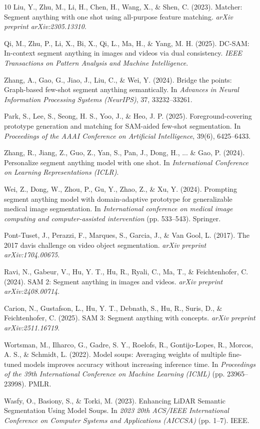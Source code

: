 \documentclass[journal,12pt,onecolumn,draftclsnofoot]{IEEEtran}
\begin{document}
\begin{thebibliography}{10}
Liu, Y., Zhu, M., Li, H., Chen, H., Wang, X., \& Shen, C. (2023).
Matcher: Segment anything with one shot using all-purpose feature matching.
\textit{arXiv preprint arXiv:2305.13310}.

Qi, M., Zhu, P., Li, X., Bi, X., Qi, L., Ma, H., \& Yang, M. H. (2025).
DC-SAM: In-context segment anything in images and videos via dual consistency.
\textit{IEEE Transactions on Pattern Analysis and Machine Intelligence}.

Zhang, A., Gao, G., Jiao, J., Liu, C., \& Wei, Y. (2024).
Bridge the points: Graph-based few-shot segment anything semantically.
In \textit{Advances in Neural Information Processing Systems (NeurIPS)}, 37, 33232--33261.

Park, S., Lee, S., Seong, H. S., Yoo, J., \& Heo, J. P. (2025).
Foreground-covering prototype generation and matching for SAM-aided few-shot segmentation.
In \textit{Proceedings of the AAAI Conference on Artificial Intelligence}, 39(6), 6425--6433.

Zhang, R., Jiang, Z., Guo, Z., Yan, S., Pan, J., Dong, H., ... \& Gao, P. (2024). 
Personalize segment anything model with one shot.
In \textit{International Conference on Learning Representations (ICLR)}.

Wei, Z., Dong, W., Zhou, P., Gu, Y., Zhao, Z., \& Xu, Y. (2024). 
Prompting segment anything model with domain-adaptive prototype for generalizable medical image segmentation. 
In \textit{International conference on medical image computing and computer-assisted intervention} (pp. 533--543). Springer.

Pont-Tuset, J., Perazzi, F., Marques, S., Garcia, J., \& Van Gool, L. (2017). 
The 2017 davis challenge on video object segmentation. 
\textit{arXiv preprint arXiv:1704.00675}.

Ravi, N., Gabeur, V., Hu, Y. T., Hu, R., Ryali, C., Ma, T., \& Feichtenhofer, C. (2024).
SAM 2: Segment anything in images and videos.
\textit{arXiv preprint arXiv:2408.00714}.

Carion, N., Gustafson, L., Hu, Y. T., Debnath, S., Hu, R., Suris, D., \& Feichtenhofer, C. (2025).
SAM 3: Segment anything with concepts.
\textit{arXiv preprint arXiv:2511.16719}.

Wortsman, M., Ilharco, G., Gadre, S. Y., Roelofs, R., Gontijo-Lopes, R., Morcos, A. S., \& Schmidt, L. (2022).
Model soups: Averaging weights of multiple fine-tuned models improves accuracy without increasing inference time.
In \textit{Proceedings of the 39th International Conference on Machine Learning (ICML)} (pp. 23965--23998). PMLR.

Wasfy, O., Basiony, S., \& Torki, M. (2023).
Enhancing LiDAR Semantic Segmentation Using Model Soups.
In \textit{2023 20th ACS/IEEE International Conference on Computer Systems and Applications (AICCSA)} (pp. 1--7). IEEE.

\end{thebibliography}
\end{document}
